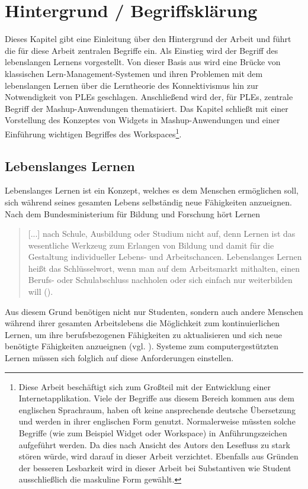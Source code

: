 \chapter{Hintergrund / Begriffsklärung}\label{chapter:Kapitel2}

Dieses Kapitel gibt eine Einleitung über den Hintergrund der Arbeit und führt die für diese Arbeit zentralen Begriffe ein. Als Einstieg wird der Begriff des lebenslangen Lernens vorgestellt. Von dieser Basis aus wird eine Brücke von klassischen Lern-Management-Systemen und ihren Problemen mit dem lebenslangen Lernen über die Lerntheorie des Konnektivismus hin zur Notwendigkeit von \acp{PLE} geschlagen. Anschließend wird der, für \acp{PLE}, zentrale Begriff der Mashup-Anwendungen thematisiert. Das Kapitel schließt mit einer Vorstellung des Konzeptes von Widgets in Mashup-Anwendungen und einer Einführung wichtigen Begriffes des Workspaces\footnote{
Diese Arbeit beschäftigt sich zum Großteil mit der Entwicklung einer Internetapplikation. Viele der Begriffe aus diesem Bereich kommen aus dem englischen Sprachraum, haben oft keine ansprechende deutsche Übersetzung und werden in ihrer englischen Form genutzt. Normalerweise müssten solche Begriffe (wie zum Beispiel Widget oder Workspace) in Anführungszeichen aufgeführt werden. Da dies nach Ansicht des Autors den Lesefluss zu stark stören würde, wird darauf in dieser Arbeit verzichtet. Ebenfalls aus Gründen der besseren Lesbarkeit wird in dieser Arbeit bei Substantiven wie Student ausschließlich die maskuline Form gewählt.}. 

\section{Lebenslanges Lernen}
Lebenslanges Lernen ist ein Konzept, welches es dem Menschen ermöglichen soll, sich während seines gesamten Lebens selbständig neue Fähigkeiten anzueignen. Nach dem Bundesministerium für Bildung und Forschung hört Lernen \begin{quotation}
 [...] nach Schule, Ausbildung oder Studium nicht auf, denn Lernen ist das wesentliche Werkzeug zum Erlangen von Bildung und damit für die Gestaltung individueller Lebens- und Arbeitschancen. Lebenslanges Lernen heißt das Schlüsselwort, wenn man auf dem Arbeitsmarkt mithalten, einen Berufs- oder Schulabschluss nachholen oder sich einfach nur weiterbilden will (\cite{BMBF2008}).
\end{quotation}
Aus diesem Grund benötigen nicht nur Studenten, sondern auch andere Menschen während ihrer gesamten Arbeitslebens die Möglichkeit zum kontinuierlichen Lernen, um ihre berufsbezogenen Fähigkeiten zu aktualisieren und sich neue benötigte Fähigkeiten anzueignen (vgl. \cite{Attwell2007}). Systeme zum computergestützten Lernen müssen sich folglich auf diese Anforderungen einstellen.

